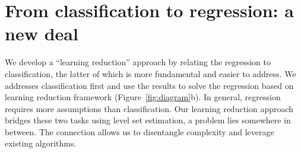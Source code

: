\documentclass[11pt]{article}
\theoremstyle{definition}
\begin{document}
\vspace{-.5cm}
\section{From classification to regression: a new deal}\label{sec:idea}
\vspace{-.5cm}
We develop a ``learning reduction'' approach by relating the regression to classification, the latter of which is more fundamental and easier to address. We addresses classification first and use the results to solve the regression based on learning reduction framework (Figure~\ref{fig:diagram}b). In general, regression requires more assumptions than classification. Our learning reduction approach bridges these two tasks using level set estimation, a problem lies somewhere in between. The connection allows us to disentangle complexity and leverage existing algorithms. 
\end{document}

